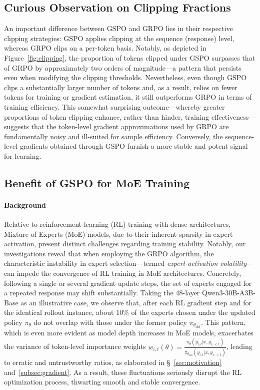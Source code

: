 \subsection{Curious Observation on Clipping Fractions}

An important difference between GSPO and GRPO lies in their respective clipping strategies: GSPO applies clipping at the sequence (response) level, whereas GRPO clips on a per-token basis. Notably, as depicted in Figure~\ref{fig:clipping}, the proportion of tokens clipped under GSPO surpasses that of GRPO by approximately two orders of magnitude—a pattern that persists even when modifying the clipping thresholds. Nevertheless, even though GSPO clips a substantially larger number of tokens and, as a result, relies on fewer tokens for training or gradient estimation, it still outperforms GRPO in terms of training efficiency. This somewhat surprising outcome—whereby greater proportions of token clipping enhance, rather than hinder, training effectiveness—suggests that the token-level gradient approximations used by GRPO are fundamentally noisy and ill-suited for sample efficiency. Conversely, the sequence-level gradients obtained through GSPO furnish a more stable and potent signal for learning.

\subsection{Benefit of GSPO for MoE Training}
\label{subsec:routing_replay}

\paragraph{Background}
Relative to reinforcement learning (RL) training with dense architectures, Mixture of Experts (MoE) models, due to their inherent sparsity in expert activation, present distinct challenges regarding training stability. Notably, our investigations reveal that when employing the GRPO algorithm, the characteristic instability in expert selection—termed \textit{expert-activation volatility}—can impede the convergence of RL training in MoE architectures. Concretely, following a single or several gradient update steps, the set of experts engaged for a repeated response may shift substantially. Taking the 48-layer Qwen3-30B-A3B-Base as an illustrative case, we observe that, after each RL gradient step and for the identical rollout instance, about 10\% of the experts chosen under the updated policy $\pi_{\theta}$ do not overlap with those under the former policy $\pi_{\theta_\text{old}}$. This pattern, which is even more evident as model depth increases in MoE models, exacerbates the variance of token-level importance weights $w_{i,t}(\theta) = \frac{ \pi_{\theta} (y_{i,t} | x, y_{i,<t}) }{ \pi_{\theta_\text{old}} (y_{i,t} | x,y_{i,<t})}$, leading to erratic and untrustworthy ratios, as elaborated in \S~\ref{sec:motivation} and~\ref{subsec:gradient}. As a result, these fluctuations seriously disrupt the RL optimization process, thwarting smooth and stable convergence.

